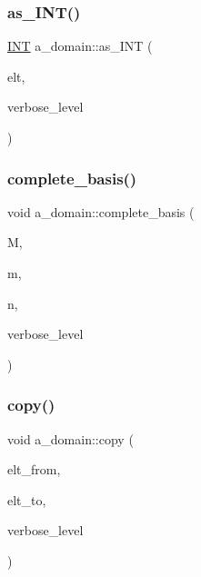 \subsubsection{\texorpdfstring{as\+\_\+\+I\+N\+T()}{as\_INT()}}
{\footnotesize\ttfamily \mbox{\hyperlink{galois_8h_a09fddde158a3a20bd2dcadb609de11dc}{I\+NT}} a\+\_\+domain\+::as\+\_\+\+I\+NT (\begin{DoxyParamCaption}\item[{\mbox{\hyperlink{galois_8h_a09fddde158a3a20bd2dcadb609de11dc}{I\+NT}} $\ast$}]{elt,  }\item[{\mbox{\hyperlink{galois_8h_a09fddde158a3a20bd2dcadb609de11dc}{I\+NT}}}]{verbose\+\_\+level }\end{DoxyParamCaption})}

\mbox{\label{classa__domain_a153d9363ae7abe19bead0d502b385a31}} 
\subsubsection{\texorpdfstring{complete\+\_\+basis()}{complete\_basis()}}
{\footnotesize\ttfamily void a\+\_\+domain\+::complete\+\_\+basis (\begin{DoxyParamCaption}\item[{\mbox{\hyperlink{galois_8h_a09fddde158a3a20bd2dcadb609de11dc}{I\+NT}} $\ast$}]{M,  }\item[{\mbox{\hyperlink{galois_8h_a09fddde158a3a20bd2dcadb609de11dc}{I\+NT}}}]{m,  }\item[{\mbox{\hyperlink{galois_8h_a09fddde158a3a20bd2dcadb609de11dc}{I\+NT}}}]{n,  }\item[{\mbox{\hyperlink{galois_8h_a09fddde158a3a20bd2dcadb609de11dc}{I\+NT}}}]{verbose\+\_\+level }\end{DoxyParamCaption})}

\mbox{\label{classa__domain_a0a6f28f247762f79caeca959f58440bc}} 
\subsubsection{\texorpdfstring{copy()}{copy()}}
{\footnotesize\ttfamily void a\+\_\+domain\+::copy (\begin{DoxyParamCaption}\item[{\mbox{\hyperlink{galois_8h_a09fddde158a3a20bd2dcadb609de11dc}{I\+NT}} $\ast$}]{elt\+\_\+from,  }\item[{\mbox{\hyperlink{galois_8h_a09fddde158a3a20bd2dcadb609de11dc}{I\+NT}} $\ast$}]{elt\+\_\+to,  }\item[{\mbox{\hyperlink{galois_8h_a09fddde158a3a20bd2dcadb609de11dc}{I\+NT}}}]{verbose\+\_\+level }\end{DoxyParamCaption})}


